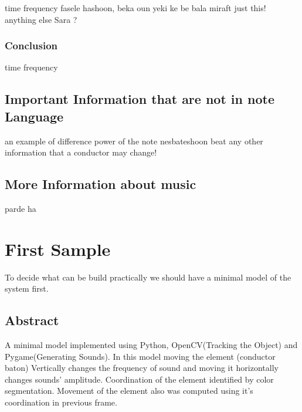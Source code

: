 \documentclass{report}
\begin{document}
time
frequency
fasele hashoon, 
beka
oun yeki ke be bala miraft
just this!
anything else Sara ?
\subsubsection{Conclusion}
time 
frequency


\subsection{Important Information that are not in note Language}
an example of difference
power of the note
nesbateshoon
beat
any other information that a conductor may change!

\subsection{More Information about music}
parde ha




\pagebreak
\section{First Sample}
To decide what can be build practically we should have a minimal model of the system first.

\subsection{Abstract}
A minimal model implemented using Python, OpenCV(Tracking the Object) and Pygame(Generating Sounds). In this model moving the element (conductor baton) Vertically changes the frequency of sound and moving it horizontally changes sounds' amplitude. Coordination of the element identified by color segmentation. \newline Movement of the element also was computed using it's coordination in previous frame.
\end{document}
